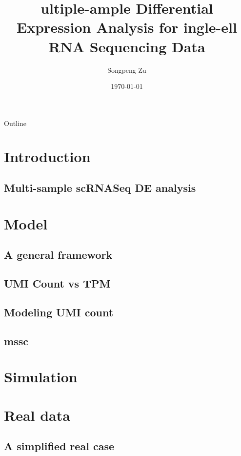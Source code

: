 \documentclass{beamer}
\title[mssc]{\myemph{M}ultiple-\myemph{S}ample Differential
  Expression Analysis for \myemph{S}ingle-\myemph{C}ell RNA Sequencing Data}
\author{Songpeng Zu}
\date{\today}
\begin{document}
\begin{frame}
  \titlepage
\end{frame}

\begin{frame}{Outline}
  \tableofcontents[hideallsubsections]
\end{frame}

\section{Introduction}
\subsection*{Multi-sample scRNASeq DE analysis}


\section{Model}
\subsection{A general framework}

\subsection{UMI Count vs TPM}

\subsection{Modeling UMI count}


\subsection{mssc}
% 
% 
% 

\section{Simulation}

\section{Real data}
\subsection{A simplified real case}

\end{document}

